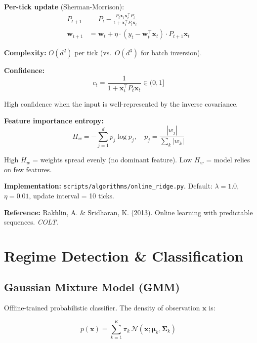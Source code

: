 \documentclass[11pt,a4paper]{article}
\begin{document}
\textbf{Per-tick update} (Sherman-Morrison):
\begin{align}
P_{t+1} &= P_t - \frac{P_t \mathbf{x}_t \mathbf{x}_t^\top P_t}{1 + \mathbf{x}_t^\top P_t \mathbf{x}_t} \\
\mathbf{w}_{t+1} &= \mathbf{w}_t + \eta \cdot (y_t - \mathbf{w}_t^\top \mathbf{x}_t) \cdot P_{t+1} \mathbf{x}_t
\end{align}

\textbf{Complexity:} $O(d^2)$ per tick (vs.\ $O(d^3)$ for batch inversion).

\textbf{Confidence:}
\begin{equation}
c_t = \frac{1}{1 + \mathbf{x}_t^\top P_t \mathbf{x}_t} \in (0, 1]
\end{equation}

High confidence when the input is well-represented by the inverse covariance.

\textbf{Feature importance entropy:}
\begin{equation}
H_w = -\sum_{j=1}^{d} p_j \log p_j, \quad p_j = \frac{|w_j|}{\sum_k |w_k|}
\end{equation}

High $H_w$ = weights spread evenly (no dominant feature). Low $H_w$ = model relies on few features.

\textbf{Implementation:} \texttt{scripts/algorithms/online\_ridge.py}. Default: $\lambda = 1.0$, $\eta = 0.01$, update interval = 10 ticks.

\textbf{Reference:} Rakhlin, A. \& Sridharan, K. (2013). Online learning with predictable sequences. \textit{COLT}.

\newpage
\section{Regime Detection \& Classification}

\subsection{Gaussian Mixture Model (GMM)}

Offline-trained probabilistic classifier. The density of observation $\mathbf{x}$ is:

\begin{equation}
p(\mathbf{x}) = \sum_{k=1}^{K} \pi_k \, \mathcal{N}(\mathbf{x}; \boldsymbol{\mu}_k, \boldsymbol{\Sigma}_k)
\end{equation}
\end{document}
